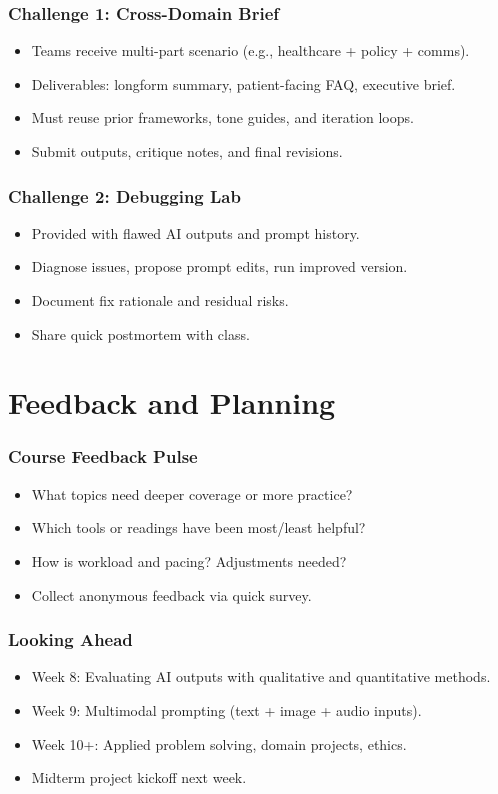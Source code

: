 \documentclass{beamer}
\begin{document}
\begin{frame}
    \frametitle{Challenge 1: Cross-Domain Brief}
    \begin{itemize}
        \item Teams receive multi-part scenario (e.g., healthcare + policy + comms).
        \item Deliverables: longform summary, patient-facing FAQ, executive brief.
        \item Must reuse prior frameworks, tone guides, and iteration loops.
        \item Submit outputs, critique notes, and final revisions.
    \end{itemize}
\end{frame}

\begin{frame}
    \frametitle{Challenge 2: Debugging Lab}
    \begin{itemize}
        \item Provided with flawed AI outputs and prompt history.
        \item Diagnose issues, propose prompt edits, run improved version.
        \item Document fix rationale and residual risks.
        \item Share quick postmortem with class.
    \end{itemize}
\end{frame}

\section{Feedback and Planning}

\begin{frame}
    \frametitle{Course Feedback Pulse}
    \begin{itemize}
        \item What topics need deeper coverage or more practice?
        \item Which tools or readings have been most/least helpful?
        \item How is workload and pacing? Adjustments needed?
        \item Collect anonymous feedback via quick survey.
    \end{itemize}
\end{frame}

\begin{frame}
    \frametitle{Looking Ahead}
    \begin{itemize}
        \item Week 8: Evaluating AI outputs with qualitative and quantitative methods.
        \item Week 9: Multimodal prompting (text + image + audio inputs).
        \item Week 10+: Applied problem solving, domain projects, ethics.
        \item Midterm project kickoff next week.
    \end{itemize}
\end{frame}
\end{document}
